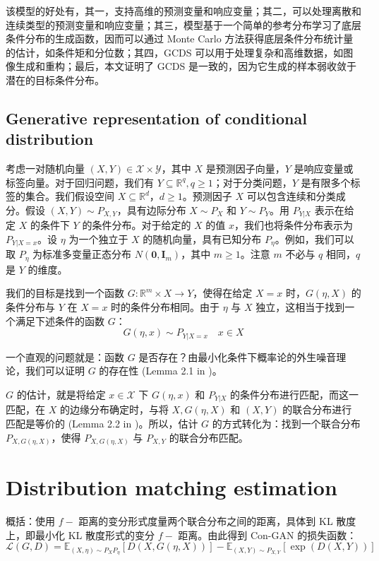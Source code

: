 \documentclass{myarticle}
\begin{document}
    该模型的好处有，其一，支持高维的预测变量和响应变量；其二，可以处理离散和连续类型的预测变量和响应变量；其三，模型基于一个简单的参考分布学习了底层条件分布的生成函数，因而可以通过 Monte Carlo 方法获得底层条件分布统计量的估计，如条件矩和分位数；其四，GCDS 可以用于处理复杂和高维数据，如图像生成和重构；最后，本文证明了 GCDS 是一致的，因为它生成的样本弱收敛于潜在的目标条件分布。

    \subsection{Generative representation of conditional distribution}

    考虑一对随机向量 $(X, Y) \in \mathcal{X} \times \mathcal{Y}$，其中 $X$ 是预测因子向量，$Y$ 是响应变量或标签向量。对于回归问题，我们有 $Y \subseteq \mathbb{R}^{q},  q \geq 1$；对于分类问题，$Y$ 是有限多个标签的集合。我们假设空间 $X \subseteq \mathbb{R}^{d}，d \geq 1$。预测因子 $X$ 可以包含连续和分类成分。假设 $(X, Y) \sim P_{X, Y}$，具有边际分布 $X \sim P_{X}$ 和 $Y \sim P_{Y}$。用 $P_{Y|X}$ 表示在给定 $X$ 的条件下 $Y$ 的条件分布。对于给定的 $X$ 的值 $x$，我们也将条件分布表示为 $P_{Y|X=x}$。设 $\eta$ 为一个独立于 $X$ 的随机向量，具有已知分布 $P_{\eta}$。例如，我们可以取 $P_{\eta}$ 为标准多变量正态分布 $N(\boldsymbol{0}, \boldsymbol{I}_{m})$，其中 $m \geq 1$。注意 $m$ 不必与 $q$ 相同，$q$ 是 $Y$ 的维度。

    我们的目标是找到一个函数 $G: \mathbb{R}^m \times X \rightarrow Y$，使得在给定 $X = x$ 时，$G(\eta, X)$ 的条件分布与 $Y$ 在 $X = x$ 时的条件分布相同。由于 $\eta$ 与 $X$ 独立，这相当于找到一个满足下述条件的函数 $G$：
    \begin{equation}
        G(\eta, x) \sim P_{Y|X=x} \quad x \in X
        \label{eq: con_dis_G_1}
    \end{equation}

    一个直观的问题就是：函数 $G$ 是否存在？由最小化条件下概率论的外生噪音理论，我们可以证明 $G$ 的存在性 (Lemma 2.1 in \cite{Zhou_Jiao_2022})。

    $G$ 的估计，就是将给定 $x\in\mathcal{X}$ 下 $G(\eta, x)$ 和 $P_{Y|X}$ 的条件分布进行匹配，而这一匹配，在 $X$ 的边缘分布确定时，与将 $X, G(\eta, X)$ 和 $(X, Y)$ 的联合分布进行匹配是等价的 (Lemma 2.2 in \cite{Zhou_Jiao_2022})。所以，估计 $G$ 的方式转化为：找到一个联合分布 $P_{X, G(\eta, X)}$，使得 $P_{X, G(\eta, X)}$ 与 $P_{X, Y}$ 的联合分布匹配。

    \section{Distribution matching estimation}

    概括：使用 $f-$ 距离的变分形式度量两个联合分布之间的距离，具体到 KL 散度上，即最小化 KL 散度形式的变分 $f-$ 距离。由此得到 Con-GAN 的损失函数：
    \begin{equation}
        \mathcal{L}(G,D)=\mathbb{E}_{(X,\eta)\sim P_XP_\eta}[D(X,G(\eta,X))]-\mathbb{E}_{(X,Y)\sim P_{X,Y}}[\exp(D(X,Y))]
        \label{eq: Con-GAN loss}
    \end{equation}

    
    \clearpage
    
    
\end{document}
